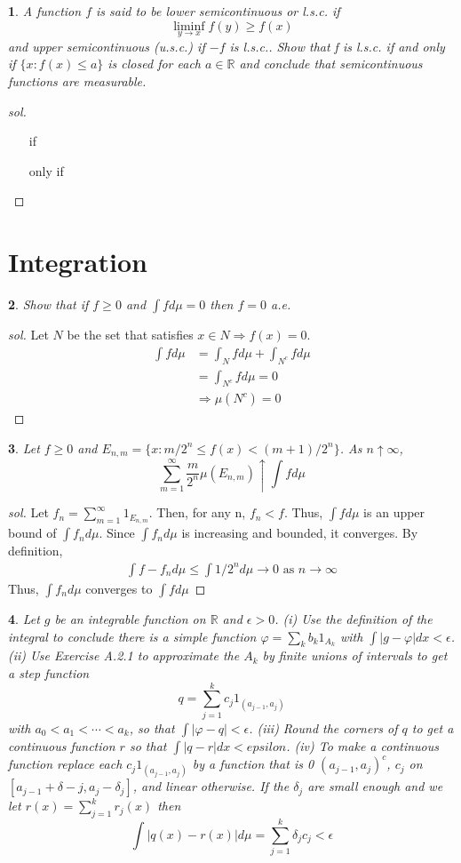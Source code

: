 \documentclass{report}
\newtheorem{ex}{}[section]
\begin{document}
\begin{ex}
A function $f$ is said to be lower semicontinuous or l.s.c. if
\[\liminf_{y\to x} f(y) \ge f(x)\]
and upper semicontinuous (u.s.c.) if $-f$ is l.s.c.. Show that f is l.s.c. if
and only if $\{x : f(x) \le a\}$ is closed for each $a \in \mathbb{R}$ and conclude that
semicontinuous functions are measurable.
\end{ex}
\begin{proof}[sol]~
\begin{enumerate}
    \item[if]
    \item[only if]
\end{enumerate}
\end{proof}
\section{Integration}
\begin{ex}
Show that if $f \ge 0$ and $\int f d\mu = 0$ then $f = 0$ a.e.
\end{ex}
\begin{proof}[sol]
Let $N$ be the set that satisfies $x \in N \Rightarrow f(x) = 0$.
\begin{align*}
    \int f d\mu &=  \int_N f d\mu  + \int_{N^c} f d\mu\\
    &= \int_{N^c} f d\mu = 0\\
    &\Rightarrow \mu(N^c) = 0
\end{align*}
\end{proof}
\begin{ex}
Let $f \ge 0$ and $E_{n,m} = \{x : m/2^n \le f(x) < (m+1)/2^n\}$. As $n \uparrow \infty$,
\[\sum_{m=1}^\infty \frac{m}{2^n} \mu(E_{n,m}) \uparrow \int f d\mu\]
\end{ex}
\begin{proof}[sol]
Let $f_n = \sum_{m=1}^\infty 1_{E_{n,m}}$. Then, for any n, $f_n < f$. Thus, $\int f d\mu$ is an upper bound of $\int f_n d\mu$. Since $\int f_n d\mu$ is increasing and bounded, it converges. By definition,
\begin{align*}
    \int f -f_n d\mu \le \int 1/2^n d\mu \to 0 \text{ as } n \to \infty
\end{align*}
Thus, $\int f_n d\mu$ converges to $\int f d\mu$
\end{proof}
\begin{ex}
Let $g$ be an integrable function on $\mathbb{R}$ and $\epsilon > 0$. (i) Use the definition of the integral to conclude there is a simple function $\varphi = \sum_k b_k1_{A_k}$ with $\int |g - \varphi| dx < \epsilon$. (ii) Use Exercise A.2.1 to approximate the $A_k$ by finite unions of intervals to get a step function
\[q = \sum_{j=1}^k c_j 1_{(a_{j-1}, a_j)}\]
with $a_0 < a_1 < \dotsb < a_k$, so that $\int |\varphi-q| < \epsilon$. (iii) Round the corners of $q$ to get a continuous function $r$ so that $\int |q - r| dx < epsilon$.
(iv) To make a continuous function replace each $c_j1_{(a_{j-1},a_j)}$ by a function
that is 0 $(a_{j-1}, a_j)^c$, $c_j$ on $[a_{j-1} + \delta - j, a_j - \delta_j ]$, and linear otherwise. If the $\delta_j$ are small enough and we let $r(x) = \sum^k_{j=1} r_j(x)$ then
\[\int |q(x) - r(x)|d\mu = \sum_{j=1}^k \delta_j c_j <\epsilon\]
\end{ex}
\end{document}
